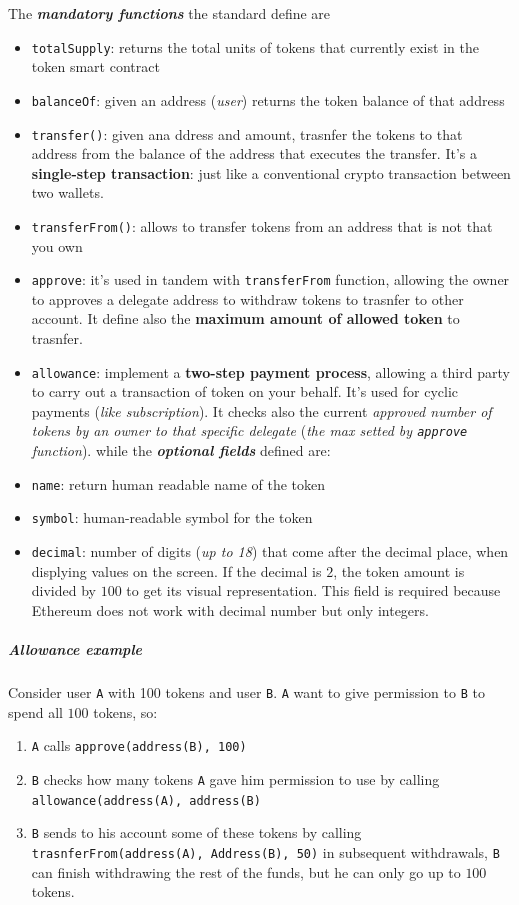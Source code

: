 \documentclass[10pt,a4paper]{report}
\begin{document}
The \textit{\textbf{mandatory functions}} the standard define are
\begin{itemize}
	\item 
	\texttt{totalSupply}: returns the total units of tokens that currently exist in the token smart contract
	\item 
	\texttt{balanceOf}: given an address (\textit{user}) returns the token balance of that address
	\item 
	\texttt{transfer()}: given ana ddress and amount, trasnfer the tokens to that address from the balance of the address that executes the transfer. It's a \textbf{single-step transaction}: just like a conventional crypto transaction between two wallets.
	\item 
	\texttt{transferFrom()}: allows to transfer tokens from an address that is not that you own
	\item 
	\texttt{approve}: it's used in tandem with \texttt{transferFrom} function, allowing the owner to approves a delegate address to withdraw tokens to trasnfer to other account. It define also the \textbf{maximum amount of allowed token} to trasnfer.
	\item 
	\texttt{allowance}: implement a \textbf{two-step payment process}, allowing a third party to carry out a transaction of token on your behalf. It's used for cyclic payments (\textit{like subscription}). It checks also the current \textit{approved number of tokens by an owner to that specific delegate} (\textit{the max setted by \texttt{approve} function}).
	while the \textit{\textbf{optional fields}} defined are:
	\item 
	\texttt{name}: return human readable name of the token
	\item 
	\texttt{symbol}: human-readable symbol for the token
	\item 
	\texttt{decimal}: number of digits (\textit{up to 18}) that come after the decimal place, when displying values on the screen. If the decimal is $2$, the token amount is divided by $100$ to get its visual representation. This field is required because Ethereum does not work with decimal number but only integers.
\end{itemize}
\subparagraph{Allowance example}\label{sec:allowance-example}
Consider user \texttt{A}  with 100 tokens and user \texttt{B}. \texttt{A} want to give permission to \texttt{B} to spend all $100$ tokens, so:
\begin{enumerate}
	\item 
	\texttt{A} calls \texttt{approve(address(B), 100)}
	\item 
	\texttt{B} checks how many tokens \texttt{A} gave him permission to use by calling \texttt{allowance(address(A), address(B)}
	\item 
	\texttt{B} sends to his account some of these tokens by calling \texttt{trasnferFrom(address(A), Address(B), 50)}
	in subsequent withdrawals, \texttt{B} can finish withdrawing the rest of the funds, but he can only go up to $100$ tokens.
\end{enumerate}
\end{document}
